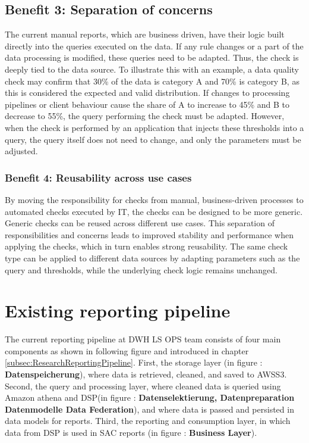 \subsection*{Benefit 3: Separation of concerns}
The current manual reports, which are business driven, have their logic built directly into the queries executed on the data. If any rule changes or a part of the data processing is modified, these queries need to be adapted. Thus, the check is deeply tied to the data source. To illustrate this with an example, a data quality check may confirm that 30\% of the data is category A and 70\% is category B, as this is considered the expected and valid distribution. If changes to processing pipelines or client behaviour cause the share of A to increase to 45\% and B to decrease to 55\%, the query performing the check must be adapted. However, when the check is performed by an application that injects these thresholds into a query, the query itself does not need to change, and only the parameters must be adjusted.

\subsubsection*{Benefit 4: Reusability across use cases}
By moving the responsibility for checks from manual, business-driven processes to automated checks executed by IT, the checks can be designed to be more generic. Generic checks can be reused across different use cases. This separation of responsibilities and concerns leads to improved stability and performance when applying the checks, which in turn enables strong reusability. The same check type can be applied to different data sources by adapting parameters such as the query and thresholds, while the underlying check logic remains unchanged.



\section{Existing reporting pipeline}
\label{SolutionReportingPipeline}
The current reporting pipeline at DWH LS OPS team consists of four main components as shown in following figure and introduced in chapter \ref{subsec:ResearchReportingPipeline}. First, the storage layer (in figure : \textbf{Datenspeicherung}), where data is retrieved, cleaned, and saved to \gls{AWSS3}. Second, the query and processing layer, where cleaned data is queried using Amazon \gls{athena} and \gls{DSP}(in figure : \textbf{Datenselektierung, Datenpreparation Datenmodelle Data Federation}), and where data is passed and persisted in data models for reports. Third, the reporting and consumption layer, in which data from DSP is used in \gls{SAC} reports (in figure : \textbf{Business Layer}).

